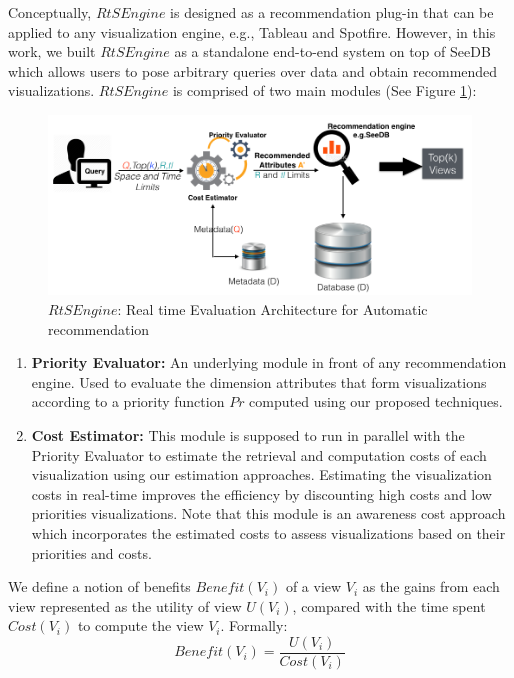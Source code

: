 Conceptually, $RtSEngine$ is designed as a recommendation plug-in that can be applied to any visualization engine, e.g., Tableau and Spotfire.
%
However, in this work, we built $RtSEngine$ as a standalone end-to-end system on top of SeeDB which allows users to pose arbitrary queries over data and obtain recommended visualizations.
%
$RtSEngine$ is comprised of two main modules (See Figure \ref{fig:arch}):
%
\begin{figure}[t]
\centering
\includegraphics[width=\textwidth]{arch_new.png}
\caption{$RtSEngine$: Real time Evaluation Architecture for Automatic recommendation}
\label{fig:arch}%
\end{figure}
%
\begin{enumerate}
\item \textbf{Priority Evaluator:} An underlying module in front of any recommendation engine. 
%
Used to evaluate the dimension attributes that form visualizations according to a priority function $Pr$ computed using our proposed techniques.
%
\item \textbf{Cost Estimator:} This module is supposed to run in parallel with the Priority Evaluator to estimate the retrieval and computation costs of each visualization using our estimation approaches. 
%
Estimating the visualization costs in real-time improves the efficiency by discounting high costs and low priorities visualizations. 
%
Note that this module is an awareness cost approach which incorporates the estimated costs to assess visualizations based on their priorities and costs.
%
\end{enumerate}
%
We define a notion of benefits $Benefit(V_i)$ of a view $V_i$ as the gains from each view represented as the utility of view $U(V_i)$, compared with the time spent $Cost(V_i)$ to compute the view $V_i$.
%
Formally:
%
\begin{equation}
\label{eq:profit}
Benefit(V_i)= \frac{U(V_i)}{Cost(V_i)}
\end{equation}
%

